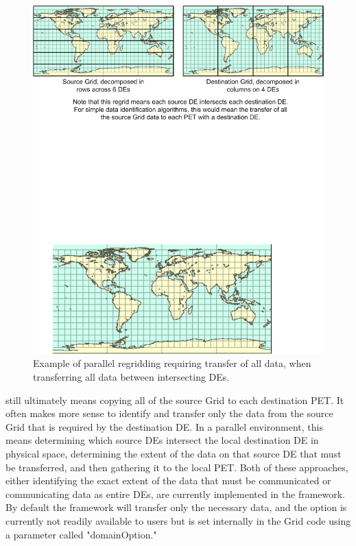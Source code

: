 \begin{center}
\begin{figure}
\caption{Example of parallel regridding requiring transfer of all data,
         when transferring all data between intersecting DEs. }
\label{fig:RToCRegrid}
\includegraphics{RToCRegrid.tif}
\end{figure}
\end{center}

still ultimately means copying all of the source Grid to each destination PET.
It often makes more sense to identify and transfer only the data from the
source Grid that is required by the destination DE.  In a parallel environment,
this means determining which source DEs intersect the local destination DE in
physical space, determining the extent of the data on that source DE that must
be transferred, and then gathering it to the local PET.  Both of these
approaches, either identifying the exact extent of the data that must be
communicated or communicating data as entire DEs, are currently implemented in
the framework.  By default the framework will transfer only the necessary data,
and the option is currently not readily available to users but is set internally
in the Grid code using a parameter called "domainOption."

